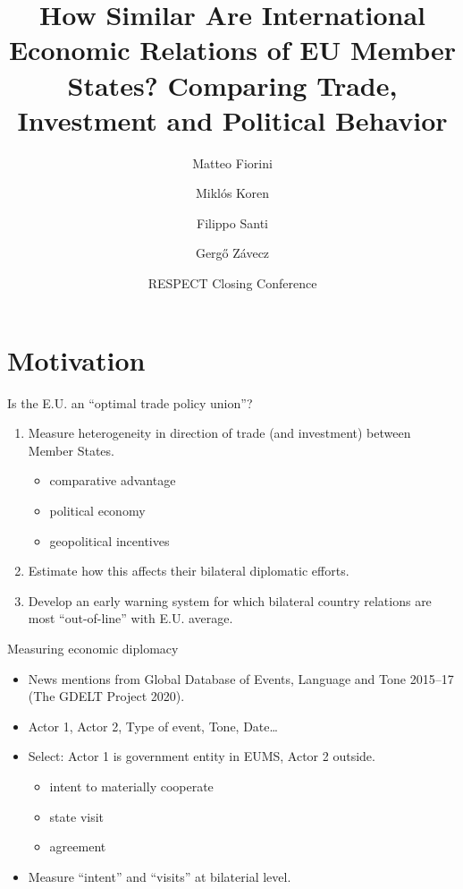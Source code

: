 \documentclass[
  ignorenonframetext,
  aspectratio=16,
]{beamer}
\title{How Similar Are International Economic Relations of EU Member
States? Comparing Trade, Investment and Political Behavior}
\author{Matteo Fiorini \and Miklós Koren \and Filippo Santi \and Gergő
Závecz}
\date{RESPECT Closing Conference}
\providecommand{\tightlist}{%
  \setlength{\itemsep}{0pt}\setlength{\parskip}{0pt}}
\begin{document}
\frame{\titlepage}

\hypertarget{motivation}{%
\section{Motivation}\label{motivation}}

\begin{frame}{Is the E.U. an ``optimal trade policy union''?}
\protect\hypertarget{is-the-e.u.-an-optimal-trade-policy-union}{}
\begin{enumerate}
\tightlist
\item
  Measure heterogeneity in direction of trade (and investment) between
  Member States.

  \begin{itemize}
  \tightlist
  \item
    comparative advantage
  \item
    political economy
  \item
    geopolitical incentives
  \end{itemize}
\item
  Estimate how this affects their bilateral diplomatic efforts.
\item
  Develop an early warning system for which bilateral country relations
  are most ``out-of-line'' with E.U. average.
\end{enumerate}
\end{frame}

\begin{frame}{Measuring economic diplomacy}
\protect\hypertarget{measuring-economic-diplomacy}{}
\begin{itemize}
\tightlist
\item
  News mentions from Global Database of Events, Language and Tone
  2015--17 (The GDELT Project 2020).
\item
  Actor 1, Actor 2, Type of event, Tone, Date\ldots{}
\item
  Select: Actor 1 is government entity in EUMS, Actor 2 outside.

  \begin{itemize}
  \tightlist
  \item
    intent to materially cooperate
  \item
    state visit
  \item
    agreement
  \end{itemize}
\item
  Measure ``intent'' and ``visits'' at bilaterial level.
\end{itemize}
\end{frame}
\end{document}
